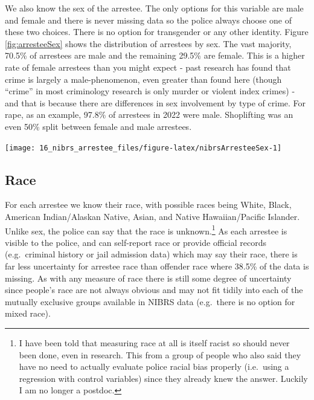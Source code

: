 \documentclass[
]{krantz}
\let\origfigure\figure
\let\endorigfigure\endfigure
\renewenvironment{figure}[1][2] {
    \expandafter\origfigure\expandafter[H]
} {
    \endorigfigure
}
\begin{document}
We also know the sex of the arrestee. The only options for
this variable are male and female and there is never missing
data so the police always choose one of these two choices.
There is no option for transgender or any other identity.
Figure \ref{fig:arresteeSex} shows the distribution of
arrestees by sex. The vast majority, 70.5\% of arrestees are
male and the remaining 29.5\% are female. This is a higher
rate of female arrestees than you might expect - past
research has found that crime is largely a male-phenomenon,
even greater than found here (though ``crime'' in most
criminology research is only murder or violent index crimes)
- and that is because there are differences in sex
involvement by type of crime. For rape, as an example,
97.8\% of arrestees in 2022 were male. Shoplifting was an
even 50\% split between female and male arrestees.

\begin{figure}

{\centering \texttt{[image: 16\_nibrs\_arrestee\_files/figure-latex/nibrsArresteeSex-1]} 

}

\caption{The share of arrestees by sex, 1991-2022.}\label{fig:nibrsArresteeSex}
\end{figure}

\subsection{Race}\label{race-4}

For each arrestee we know their race, with possible races
being White, Black, American Indian/Alaskan Native, Asian,
and Native Hawaiian/Pacific Islander. Unlike sex, the police
can say that the race is unknown.\footnote{I have been told
  that measuring race at all is itself racist so should
  never been done, even in research. This from a group of
  people who also said they have no need to actually
  evaluate police racial bias properly (i.e.~using a
  regression with control variables) since they already knew
  the answer. Luckily I am no longer a postdoc.} As each
arrestee is visible to the police, and can self-report race
or provide official records (e.g.~criminal history or jail
admission data) which may say their race, there is far less
uncertainty for arrestee race than offender race where
38.5\% of the data is missing. As with any measure of race
there is still some degree of uncertainty since people's
race are not always obvious and may not fit tidily into each
of the mutually exclusive groups available in NIBRS data
(e.g.~there is no option for mixed race).
\end{document}

